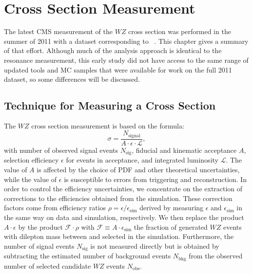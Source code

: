\chapter{Cross Section Measurement}
\label{chapter:cross-section}

\newcommand{\nsig}{\ensuremath{N_\mathrm{sig}}\xspace}
\newcommand{\nbkg}{\ensuremath{N_\mathrm{bkg}}\xspace}
\newcommand{\nobs}{\ensuremath{N_\mathrm{obs}}\xspace}
\newcommand{\esim}{\ensuremath{\epsilon_\mathrm{sim}}\xspace}
\newcommand{\errmat}{\textbf{\textit{E}}\xspace}

The latest CMS measurement of the $WZ$ cross section was performed in the summer of 2011 with a dataset corresponding to \earlylumi~\cite{CMS-PAS-EWK-11-010}.  This chapter gives a summary of that effort.  Although much of the analysis approach is identical to the resonance measurement, this early study did not have access to the same range of updated tools and MC samples that were available for work on the full 2011 dataset, so some differences will be discussed.

\section{Technique for Measuring a Cross Section}

The $WZ$ cross section measurement is based on the formula:
\begin{equation}
  \label{eq:simple-cross-section}
  \sigma = \frac{N_\text{signal}}{A\cdot\epsilon\cdot\mathcal{L}},
\end{equation}
with number of observed signal events \nsig, fiducial and kinematic acceptance $A$, selection efficiency $\epsilon$ for events in acceptance, and integrated luminosity $\mathcal{L}$.  The value of $A$ is affected by the choice of PDF and other theoretical uncertainties, while the value of  $\epsilon$ is susceptible to errors from triggering and reconstruction.  In order to control the efficiency uncertainties, we concentrate on the extraction of corrections to the efficiencies obtained from the simulation. These correction factors come from efficiency
ratios $\rho = \epsilon / \esim$ derived by measuring $\epsilon$ and $\esim$ in the same way on data and simulation, respectively. We then replace the product $A \cdot \epsilon$ by the product $\mathcal{F} \cdot \rho$ with $\mathcal{F} \equiv  A \cdot \esim$ the fraction of generated $WZ$ events with dilepton mass between  and  selected in the simulation.  Furthermore, the number of signal events \nsig{} is not measured directly but is obtained by subtracting the estimated number of background events \nbkg{} from the observed number of selected candidate $WZ$ events \nobs.

